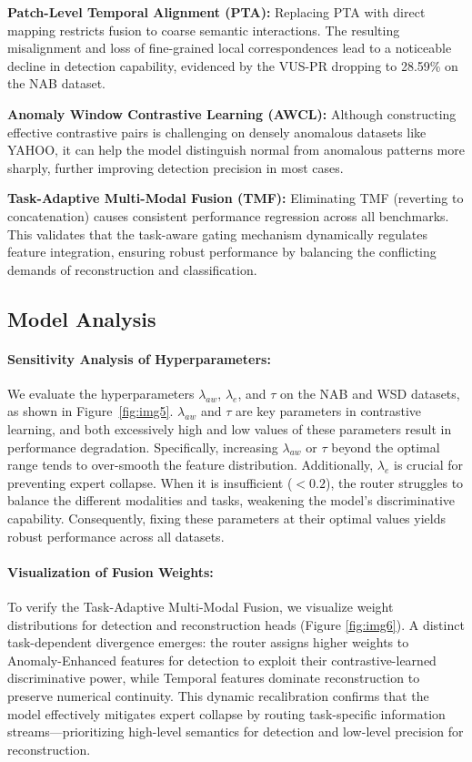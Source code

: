 \documentclass{article}
\theoremstyle{plain}
\theoremstyle{definition}
\theoremstyle{remark}
\begin{document}
\textbf{Patch-Level Temporal Alignment (PTA):} Replacing PTA with direct mapping restricts fusion to coarse semantic interactions. The resulting misalignment and loss of fine-grained local correspondences lead to a noticeable decline in detection capability, evidenced by the VUS-PR dropping to 28.59\% on the NAB dataset.

\textbf{Anomaly Window Contrastive Learning (AWCL):} Although constructing effective contrastive pairs is challenging on densely anomalous datasets like YAHOO, it can help the model distinguish normal from anomalous patterns more sharply, further improving detection precision in most cases.

\textbf{Task-Adaptive Multi-Modal Fusion (TMF):} Eliminating TMF (reverting to concatenation) causes consistent performance regression across all benchmarks. This validates that the task-aware gating mechanism dynamically regulates feature integration, ensuring robust performance by balancing the conflicting demands of reconstruction and classification.


\subsection{Model Analysis}


\paragraph{Sensitivity Analysis of Hyperparameters:}
We evaluate the hyperparameters $\lambda_{aw}$, $\lambda_{e}$, and $\tau$ on the NAB and WSD datasets, as shown in Figure~\ref{fig:img5}. $\lambda_{aw}$ and $\tau$ are key parameters in contrastive learning, and both excessively high and low values of these parameters result in performance degradation. Specifically, increasing $\lambda_{aw}$ or $\tau$ beyond the optimal range tends to over-smooth the feature distribution. Additionally, $\lambda_{e}$ is crucial for preventing expert collapse. When it is insufficient ($<0.2$), the router struggles to balance the different modalities and tasks, weakening the model's discriminative capability. Consequently, fixing these parameters at their optimal values yields robust performance across all datasets.

\paragraph{Visualization of Fusion Weights:} To verify the Task-Adaptive Multi-Modal Fusion, we visualize weight distributions for detection and reconstruction heads (Figure \ref{fig:img6}). A distinct task-dependent divergence emerges: the router assigns higher weights to Anomaly-Enhanced features for detection to exploit their contrastive-learned discriminative power, while Temporal features dominate reconstruction to preserve numerical continuity. This dynamic recalibration confirms that the model effectively mitigates expert collapse by routing task-specific information streams—prioritizing high-level semantics for detection and low-level precision for reconstruction.
\end{document}
